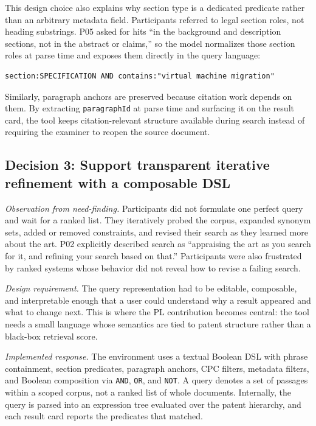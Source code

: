 \documentclass[sigconf]{acmart}
\begin{document}
This design choice also explains why section type is a dedicated predicate
rather than an arbitrary metadata field. Participants referred to legal section
roles, not heading substrings. P05 asked for hits ``in the background and
description sections, not in the abstract or claims,'' so the model normalizes
those section roles at parse time and exposes them directly in the query
language:

\begin{lstlisting}[caption={Section-scoped containment query.}]
section:SPECIFICATION AND contains:"virtual machine migration"
\end{lstlisting}

Similarly, paragraph anchors are preserved because citation work depends on
them. By extracting \texttt{paragraphId} at parse time and surfacing it on the
result card, the tool keeps citation-relevant structure available during search
instead of requiring the examiner to reopen the source document.


\subsection{Decision 3: Support transparent iterative refinement with a composable DSL}

\emph{Observation from need-finding.} Participants did not formulate one
perfect query and wait for a ranked list. They iteratively probed the corpus,
expanded synonym sets, added or removed constraints, and revised their search
as they learned more about the art. P02 explicitly described search as
``appraising the art as you search for it, and refining your search based on
that.'' Participants were also frustrated by ranked systems whose behavior did
not reveal how to revise a failing search.

\emph{Design requirement.} The query representation had to be editable,
composable, and interpretable enough that a user could understand why a result
appeared and what to change next. This is where the PL contribution becomes
central: the tool needs a small language whose semantics are tied to patent
structure rather than a black-box retrieval score.

\emph{Implemented response.} The environment uses a textual Boolean DSL with
phrase containment, section predicates, paragraph anchors, CPC filters,
metadata filters, and Boolean composition via \texttt{AND}, \texttt{OR}, and
\texttt{NOT}. A query denotes a set of passages within a scoped corpus, not a
ranked list of whole documents. Internally, the query is parsed into an
expression tree evaluated over the patent hierarchy, and each result card
reports the predicates that matched.
\end{document}

